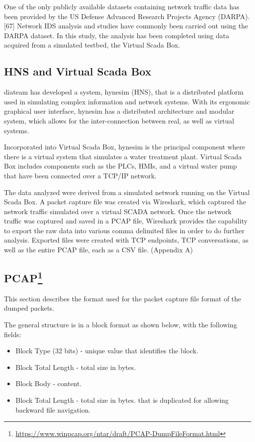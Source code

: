 \documentclass[11pt,]{article}
\let\rmarkdownfootnote\footnote%
\def\footnote{\protect\rmarkdownfootnote}
\begin{document}
One of the only publicly available datasets containing network traffic
data has been provided by the US Defense Advanced Research Projects
Agency (DARPA).{[}67{]} Network IDS analysis and studies have commonly
been carried out using the DARPA dataset. In this study, the analysis
has been completed using data acquired from a simulated testbed, the
Virtual Scada Box.

\subsection{HNS and Virtual Scada Box}\label{hns-and-virtual-scada-box}

diateam has developed a system, hynesim (HNS), that is a distributed
platform used in simulating complex information and network systems.
With its ergonomic graphical user interface, hynesim has a distributed
architecture and modular system, which allows for the inter-connection
between real, as well as virtual systems.

Incorporated into Virtual Scada Box, hynesim is the principal component
where there is a virtual system that simulates a water treatment plant.
Virtual Scada Box includes components such as the PLCs, HMIs, and a
virtual water pump that have been connected over a TCP/IP network.

The data analyzed were derived from a simulated network running on the
Virtual Scada Box. A packet capture file was created via Wireshark,
which captured the network traffic simulated over a virtual SCADA
network. Once the network traffic was captured and saved in a PCAP file,
Wireshark provides the capability to export the raw data into various
comma delimited files in order to do further analysis. Exported files
were created with TCP endpoints, TCP conversations, as well as the
entire PCAP file, each as a CSV file. (Appendix A)

\subsection[PCAP]{PCAP\footnote{\url{https://www.winpcap.org/ntar/draft/PCAP-DumpFileFormat.html}}}\label{pcap2}

This section describes the format used for the packet capture file
format of the dumped packets.

The general structure is in a block format as shown below, with the
following fields:

\begin{itemize}
\itemsep1pt\parskip0pt
\item
  Block Type (32 bits) - unique value that identifies the block.
\item
  Block Total Length - total size in bytes.
\item
  Block Body - content.
\item
  Block Total Length - total size in bytes. that is duplicated for
  allowing backward file navigation.
\end{itemize}
\end{document}
